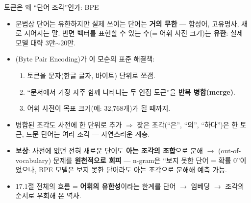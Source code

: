 \documentclass[aspectratio=169,11pt]{beamer}
\begin{document}
\begin{frame}{토큰은 왜 ``단어 조각''인가: BPE}
  \begin{itemize}
    \item 문법상 단어는 유한하지만 실제 쓰이는 단어는
      \textbf{거의 무한} --- 합성어, 고유명사, 새로 지어지는 말.
      반면 벡터를 표현할 수 있는 수(= 어휘 사전 크기)는
      \textbf{유한}: 실제 모델 대략 3만$\sim$20만.
    \item {}(Byte Pair Encoding)가 이 모순의 표준 해결책:
      \begin{enumerate}
        \item 토큰을 문자(한글 글자, 바이트) 단위로 쪼갬.
        \item ``문서에서 가장 자주 함께 나타나는 두 인접 토큰''을
          \textbf{반복 병합(merge)}.
        \item 어휘 사전이 목표 크기(예: 32{,}768개)가 될 때까지.
      \end{enumerate}
    \item 병합된 조각도 사전에 한 단위로 추가 $\Rightarrow$
      잦은 조각(``은'', ``의'', ``하다'')은 한 토큰, 드문 단어는
      여러 조각 --- 자연스러운 계층.
    \item \textbf{보상}: 사전에 없던 전혀 새로운 단어도
      \textbf{아는 조각의 조합}으로 분해 $\to$ 
      (out-of-vocabulary) 문제를 \textbf{원천적으로 회피} ---
      n-gram은 ``보지 못한 단어 = 확률 0''이었으나, BPE 모델은
      보지 못한 단어라도 아는 조각으로 분해해 예측 가능.
    \item 17.1절 전체의 흐름 = \textbf{어휘의 유한성}이라는
      한계를 단어 $\to$ 임베딩 $\to$ 조각의 순서로 우회해 온
      역사.
  \end{itemize}
\end{frame}
\end{document}
